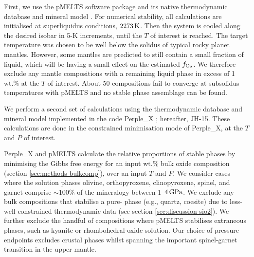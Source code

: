 \documentclass[fleqn,usenatbib,twocolumn]{mnras}
\newcommand{\fo}{$f_{\ce{O2}}$}
\begin{document}
First, we use the pMELTS software package and its native thermodynamic database and mineral model \citep{asimow_algorithmic_1998, ghiorso_pmelts_2002}. For numerical stability, all calculations are initialised at superliquidus conditions, $2273\,{\rm K}$. Then the system is cooled along the desired isobar in 5-K increments, until the $T$ of interest is reached. The target temperature was chosen to be well below the solidus of typical rocky planet mantles. However, some mantles are predicted to still contain a small fraction of liquid, which will be having a small effect on the estimated \fo.  We therefore exclude any mantle compositions with a remaining liquid phase in excess of 1 wt.\% at the $T$ of interest. About 50 compositions fail to converge at subsolidus temperatures with pMELTS and no stable phase assemblage can be found. 

We perform a second set of calculations using the \citet{jennings_simple_2015} thermodynamic database and mineral model implemented in the code Perple\_X \citep{connolly_geodynamic_2009}; hereafter, JH-15. These calculations are done in the constrained minimisation mode of Perple\_X, at the $T$ and $P$ of interest.


Perple\_X and pMELTS calculate the relative proportions of stable phases by minimising the Gibbs free energy for an input wt.\% bulk oxide composition (section \ref{sec:methods-bulkcomp}), over an input $T$ and $P$. We consider cases where the solution phases olivine, orthopyroxene, clinopyroxene, spinel, and garnet comprise $\sim$100\% of the mineralogy between 1--$4\,{\rm GPa}$. We exclude any bulk compositions that stabilise a pure- phase (e.g., quartz, coesite) due to less-well-constrained thermodynamic data (see section \ref{sec:discussion-sio2}). We further exclude the handful of compositions where pMELTS stabilises extraneous phases, such as kyanite or rhombohedral-oxide solution. Our choice of pressure endpoints excludes crustal phases whilst spanning the important spinel-garnet transition in the upper mantle. 
\end{document}
